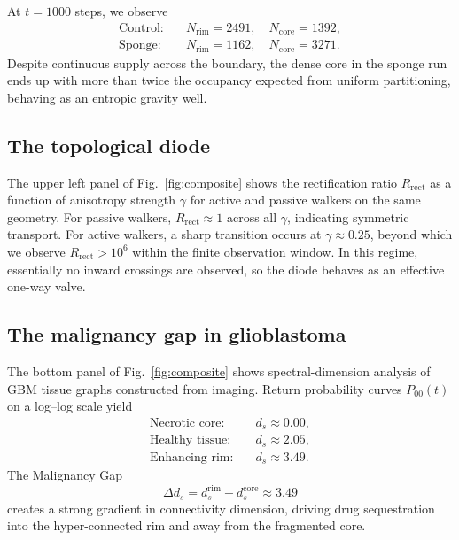 \documentclass[aps,pre,twocolumn,superscriptaddress,10pt,floatfix]{revtex4-2}
\begin{document}
At $t = 1000$ steps, we observe
\begin{align}
  \text{Control:} \quad & N_{\mathrm{rim}} = 2491,\quad N_{\mathrm{core}} = 1392, \nonumber \\
  \text{Sponge:} \quad & N_{\mathrm{rim}} = 1162,\quad N_{\mathrm{core}} = 3271.
\end{align}
Despite continuous supply across the boundary, the dense core in the sponge run ends up with more than twice the occupancy expected from uniform partitioning, behaving as an entropic gravity well.

\subsection{The topological diode}

The upper left panel of Fig.~\ref{fig:composite} shows the rectification ratio $R_{\mathrm{rect}}$ as a function of anisotropy strength $\gamma$ for active and passive walkers on the same geometry. For passive walkers, $R_{\mathrm{rect}} \approx 1$ across all $\gamma$, indicating symmetric transport. For active walkers, a sharp transition occurs at $\gamma \approx 0.25$, beyond which we observe $R_{\mathrm{rect}} > 10^{6}$ within the finite observation window. In this regime, essentially no inward crossings are observed, so the diode behaves as an effective one-way valve.

\subsection{The malignancy gap in glioblastoma}

The bottom panel of Fig.~\ref{fig:composite} shows spectral-dimension analysis of GBM tissue graphs constructed from imaging. Return probability curves $P_{00}(t)$ on a log--log scale yield
\begin{align}
  \text{Necrotic core:} \quad & d_s \approx 0.00, \nonumber \\
  \text{Healthy tissue:} \quad & d_s \approx 2.05, \nonumber \\
  \text{Enhancing rim:} \quad & d_s \approx 3.49.
\end{align}
The Malignancy Gap
\begin{equation}
  \Delta d_s = d_s^{\mathrm{rim}} - d_s^{\mathrm{core}} \approx 3.49
\end{equation}
creates a strong gradient in connectivity dimension, driving drug sequestration into the hyper-connected rim and away from the fragmented core.
\end{document}
